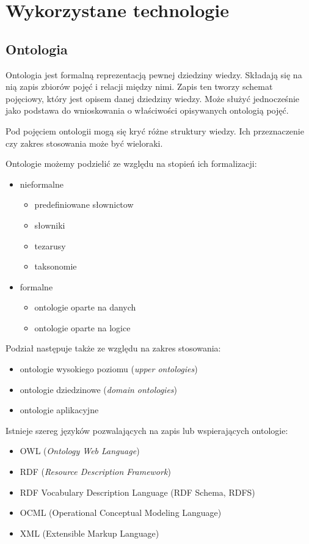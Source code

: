 \section{Wykorzystane technologie}
\label{cha:technologie}

\subsection{Ontologia}
\label{sec:ont}

Ontologia jest formalną reprezentacją pewnej dziedziny wiedzy. Składają się na nią zapis zbiorów pojęć i relacji między nimi. Zapis ten tworzy schemat pojęciowy, który jest opisem danej dziedziny wiedzy. Może służyć jednocześnie jako podstawa do wnioskowania o właściwości opisywanych ontologią pojęć.	 \cite {7}

Pod pojęciem ontologii mogą się kryć różne struktury wiedzy. Ich przeznaczenie czy zakres stosowania może być wieloraki.

Ontologie możemy podzielić ze względu na stopień ich formalizacji:
\begin{itemize}
\item nieformalne
	\begin{itemize}
		\item predefiniowane słownictow
		\item słowniki
		\item tezarusy
		\item taksonomie
	\end{itemize}
\item formalne
	\begin{itemize}
		\item ontologie oparte na danych
		\item ontologie oparte na logice
	\end{itemize}
\end{itemize}

Podział następuje także ze względu na zakres stosowania:
\begin{itemize}
\item ontologie wysokiego poziomu (\textit{upper ontologies})
\item ontologie dziedzinowe (\textit{domain ontologies})
\item ontologie aplikacyjne
\end{itemize}

Istnieje szereg języków pozwalających na zapis lub wspierających ontologie:
\begin{itemize}
\item OWL (\textit{Ontology Web Language})
\item RDF (\textit{Resource Description Framework})
\item RDF Vocabulary Description Language (RDF Schema, RDFS)
\item OCML (Operational Conceptual Modeling Language)
\item XML (Extensible Markup Language)
\end{itemize}


